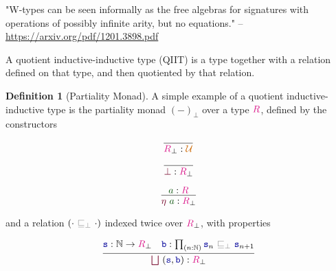 \documentclass[twoside,11pt,openright]{report}
\theoremstyle{plain} %
\theoremstyle{definition}
\newtheorem{defn}{Definition}[section]
\theoremstyle{remark}
\newcommand*{\term}[1]{\textcolor{green!30!black}{#1}} %
\newcommand*{\type}[1]{\textcolor{magenta!90!black}{#1}}
\newcommand*{\universe}[1]{\textcolor{orange!80!black}{#1}}
\newcommand*{\relation}[1]{\textcolor{gray}{\ensuremath{\mathtt{#1}}}}
\newcommand*{\function}[1]{\textcolor{blue!60!black}{\ensuremath{\mathtt{#1}}}}
\newcommand*{\constructor}[1]{\textcolor{purple!60!black}{\ensuremath{\mathtt{#1}}}}
\begin{document}
"W-types can be seen informally as the free algebras for signatures with operations of possibly infinite arity, but no equations." -- \url{https://arxiv.org/pdf/1201.3898.pdf}

A quotient inductive-inductive type (QIIT) is a type together with a relation defined on that type, and then quotiented by that relation.
\begin{defn}[Partiality Monad]
  A simple example of a quotient inductive-inductive type is the partiality monad \((-)_\bot\) over a type \(\type{R}\), defined by the constructors\\[-9mm]
  \begin{center}
    \begin{minipage}{0.25\linewidth}
      \begin{equation}
        \infer{\type{R}_\bot : \universe{\mathcal{U}}}{}
      \end{equation}
    \end{minipage}
    \hfill
    \begin{minipage}{0.25\linewidth}
      \begin{equation}
        \infer{\constructor{\bot} : \type{R}_\bot}{}
      \end{equation}
    \end{minipage}
    \hfill
    \begin{minipage}{0.25\linewidth}
      \begin{equation}
        \infer{\constructor{\eta}~\term{a} : \type{R}_\bot}{\term{a} : \type{R}}
      \end{equation}
    \end{minipage}
  \end{center}
  and a relation \((\cdot~\relation{\sqsubseteq_{\bot}}~\cdot)\) indexed twice over \(\type{R}_\bot\), with properties\\[-9mm] 
  \begin{center}
    \begin{minipage}{0.45\linewidth}
      \begin{equation}
        \infer{\constructor{\bigsqcup}~(\function{s},\function{b}) : \type{R}_\bot}{\function{s} : \mathbb{N} \rightarrow \type{R}_\bot & \function{b} : \prod_{(n : \mathbb{N})} \function{s}_n~\relation{\sqsubseteq_{\bot}}~\function{s}_{n+1} }
      \end{equation}
    \end{minipage}

\end{center}
\end{defn}
\end{document}
